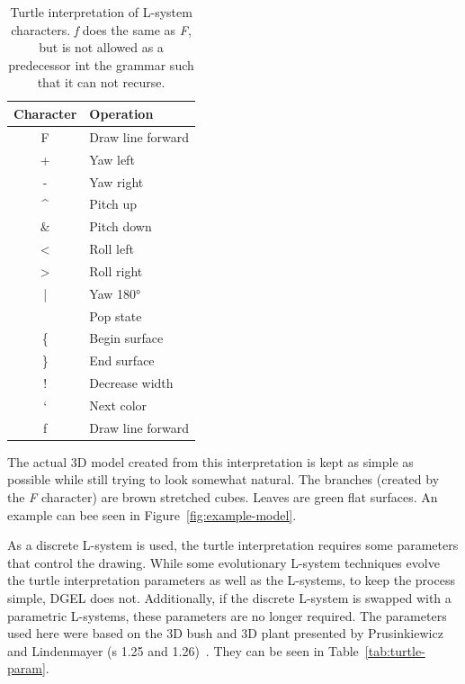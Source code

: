 \begin{table}
    \centering
    \begin{tabular}{| c | l |}
    \hline
    \textbf{Character} & \textbf{Operation} \\ \hline
    F & Draw line forward \\ \hline
    + & Yaw left \\ \hline
    - & Yaw right \\ \hline
    \textasciicircum & Pitch up \\ \hline
    \& & Pitch down \\ \hline
    < & Roll left \\ \hline
    > & Roll right \\ \hline
    | & Yaw 180° \\ \hline
    [ & Push state \\ \hline
    ] & Pop state \\ \hline
    \{ & Begin surface \\ \hline
    \} & End surface \\ \hline
    ! & Decrease width \\ \hline
    ` & Next color \\ \hline
    f & Draw line forward \\
    \hline
    \end{tabular}
    \caption[Turtle interpretation of L-system characters]{Turtle interpretation of L-system characters. \textit{f} does the same as \textit{F}, but is not allowed as a predecessor int the grammar such that it can not recurse.}
    \label{tab:turtle-cmd}
\end{table}

The actual 3D model created from this interpretation is kept as simple as possible while still trying to look somewhat natural.
The branches (created by the \textit{F} character) are brown stretched cubes.
Leaves are green flat surfaces.
An example can bee seen in Figure~\ref{fig:example-model}.

As a discrete L-system is used, the turtle interpretation requires some parameters that control the drawing.
While some evolutionary L-system techniques evolve the turtle interpretation parameters as well as the L-systems, to keep the process simple, DGEL does not.
Additionally, if the discrete L-system is swapped with a parametric L-systems, these parameters are no longer required.
The parameters used here were based on the 3D bush and 3D plant presented by Prusinkiewicz and Lindenmayer (s 1.25 and 1.26)~\cite{2012Prusinkiewicz}.
They can be seen in Table~\ref{tab:turtle-param}.

